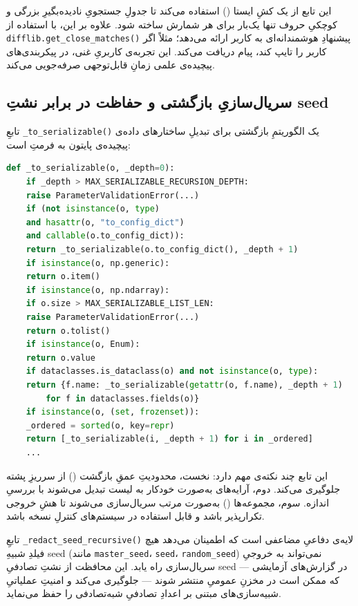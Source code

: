 این تابع از یک کشِ ایستا () استفاده می‌کند تا جدولِ جستجویِ نادیده‌بگیرِ بزرگی و کوچکیِ حروف تنها یک‌بار برای هر شمارش ساخته شود. علاوه بر این، با استفاده از \texttt{difflib.get\_close\_matches()} پیشنهادِ هوشمندانه‌ای به کاربر ارائه می‌دهد؛ مثلاً اگر کاربر  را تایپ کند، پیام  دریافت می‌کند. این تجربه‌ی کاربریِ غنی، در پیکربندی‌های پیچیده‌ی علمی زمانِ قابل‌توجهی صرفه‌جویی می‌کند.

\subsection{سریال‌سازیِ بازگشتی و حفاظت در برابر نشتِ seed}

تابعِ \texttt{\_to\_serializable()} یک الگوریتمِ بازگشتی برای تبدیلِ ساختارهای داده‌ی پیچیده‌ی پایتون به فرمتِ  است:

\begin{lstlisting}[language=Python]
	def _to_serializable(o, _depth=0):
	if _depth > MAX_SERIALIZABLE_RECURSION_DEPTH:
	raise ParameterValidationError(...)
	if (not isinstance(o, type)
	and hasattr(o, "to_config_dict")
	and callable(o.to_config_dict)):
	return _to_serializable(o.to_config_dict(), _depth + 1)
	if isinstance(o, np.generic):
	return o.item()
	if isinstance(o, np.ndarray):
	if o.size > MAX_SERIALIZABLE_LIST_LEN:
	raise ParameterValidationError(...)
	return o.tolist()
	if isinstance(o, Enum):
	return o.value
	if dataclasses.is_dataclass(o) and not isinstance(o, type):
	return {f.name: _to_serializable(getattr(o, f.name), _depth + 1)
		for f in dataclasses.fields(o)}
	if isinstance(o, (set, frozenset)):
	_ordered = sorted(o, key=repr)
	return [_to_serializable(i, _depth + 1) for i in _ordered]
	...
\end{lstlisting}

این تابع چند نکته‌ی مهم دارد: نخست، محدودیتِ عمقِ بازگشت () از سرریزِ پشته جلوگیری می‌کند. دوم، آرایه‌های  به‌صورت خودکار به لیست تبدیل می‌شوند با بررسیِ اندازه. سوم، مجموعه‌ها () به‌صورت مرتب سریال‌سازی می‌شوند تا هشِ خروجی تکرارپذیر باشد و قابل استفاده در سیستم‌های کنترلِ نسخه باشد.

تابعِ \texttt{\_redact\_seed\_recursive()} لایه‌ی دفاعیِ مضاعفی است که اطمینان می‌دهد هیچ فیلدِ شبیهِ seed (مانند \texttt{master\_seed}، \texttt{seed}، \texttt{random\_seed}) نمی‌تواند به خروجیِ سریال‌سازی راه یابد. این محافظت از نشتِ تصادفیِ seed در گزارش‌های آزمایشی — که ممکن است در مخزنِ عمومیِ  منتشر شوند — جلوگیری می‌کند و امنیتِ عملیاتیِ شبیه‌سازی‌های مبتنی بر اعدادِ تصادفیِ شبه‌تصادفی را حفظ می‌نماید.

